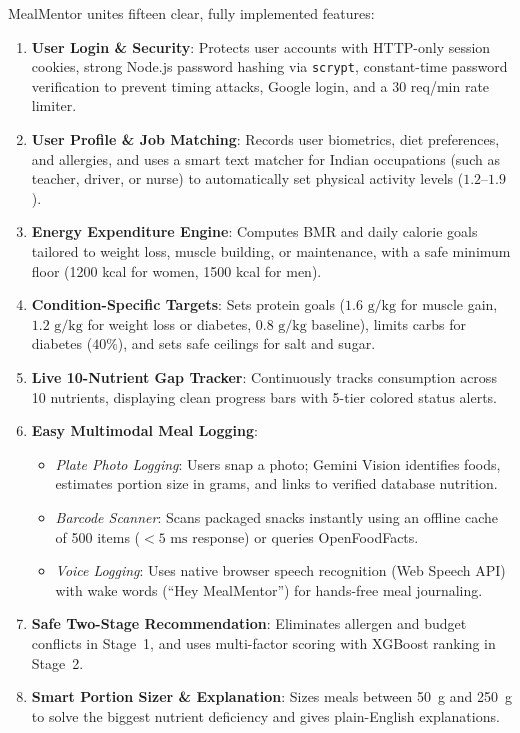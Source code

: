 \documentclass[10pt, conference, letterpaper]{IEEEtran}
\begin{document}
MealMentor unites fifteen clear, fully implemented features:
\begin{enumerate}[leftmargin=*, label=\bfseries\arabic*., itemsep=3.5pt, parsep=0pt]
    \item \textbf{User Login \& Security}: Protects user accounts with HTTP-only session cookies, strong Node.js password hashing via \texttt{scrypt}, constant-time password verification to prevent timing attacks, Google login, and a 30 req/min rate limiter.
    \item \textbf{User Profile \& Job Matching}: Records user biometrics, diet preferences, and allergies, and uses a smart text matcher for Indian occupations (such as teacher, driver, or nurse) to automatically set physical activity levels ($1.2\text{--}1.9$).
    \item \textbf{Energy Expenditure Engine}: Computes BMR and daily calorie goals tailored to weight loss, muscle building, or maintenance, with a safe minimum floor (1200 kcal for women, 1500 kcal for men).
    \item \textbf{Condition-Specific Targets}: Sets protein goals ($1.6\text{ g/kg}$ for muscle gain, $1.2\text{ g/kg}$ for weight loss or diabetes, $0.8\text{ g/kg}$ baseline), limits carbs for diabetes ($40\%$), and sets safe ceilings for salt and sugar.
    \item \textbf{Live 10-Nutrient Gap Tracker}: Continuously tracks consumption across 10 nutrients, displaying clean progress bars with 5-tier colored status alerts.
    \item \textbf{Easy Multimodal Meal Logging}:
    \begin{itemize}[leftmargin=1.2em, nosep]
        \item \textit{Plate Photo Logging}: Users snap a photo; Gemini Vision identifies foods, estimates portion size in grams, and links to verified database nutrition.
        \item \textit{Barcode Scanner}: Scans packaged snacks instantly using an offline cache of 500 items ($<5\text{ ms}$ response) or queries OpenFoodFacts.
        \item \textit{Voice Logging}: Uses native browser speech recognition (Web Speech API) with wake words (``Hey MealMentor'') for hands-free meal journaling.
    \end{itemize}
    \item \textbf{Safe Two-Stage Recommendation}: Eliminates allergen and budget conflicts in Stage~1, and uses multi-factor scoring with XGBoost ranking in Stage~2.
    \item \textbf{Smart Portion Sizer \& Explanation}: Sizes meals between 50~g and 250~g to solve the biggest nutrient deficiency and gives plain-English explanations.

\end{enumerate}
\end{document}

